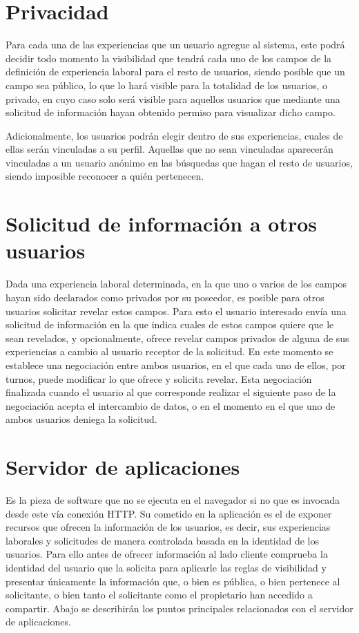 \documentclass[a4paper, 12pt]{book}
\begin{document}
\section{Privacidad}
\label{sec:intro_privacity}
Para cada una de las experiencias que un usuario agregue al sistema, este podrá decidir todo momento la visibilidad que tendrá cada uno de los campos de la definición de experiencia laboral para el resto de usuarios, siendo posible que un campo sea público, lo que lo hará visible para la totalidad de los usuarios, o privado, en cuyo caso solo será visible para aquellos usuarios que mediante  una solicitud de información hayan obtenido permiso para visualizar dicho campo.

Adicionalmente, los usuarios podrán elegir dentro de sus experiencias, cuales de ellas serán vinculadas a su perfil. Aquellas que no sean vinculadas aparecerán vinculadas a un usuario anónimo en las búsquedas que hagan el resto de usuarios, siendo imposible reconocer a quién pertenecen.

\section{Solicitud de información a otros usuarios}
\label{sec:intro_inforequest}
Dada una experiencia laboral determinada, en la que uno o varios de los campos hayan sido declarados como privados por su poseedor, es posible para otros usuarios solicitar revelar estos campos.
Para esto el usuario interesado envía una solicitud de información en la que indica cuales de estos campos quiere que le sean revelados, y opcionalmente, ofrece revelar campos privados de alguna de sus experiencias a cambio al usuario receptor de la solicitud.
En este momento se establece una negociación entre ambos usuarios, en el que cada uno de ellos, por turnos, puede modificar lo que ofrece y solicita revelar. Esta negociación finalizada cuando el usuario al que corresponde realizar el siguiente paso de la negociación acepta el intercambio de datos, o en el momento en el que uno de ambos usuarios deniega la solicitud.


\section{Servidor de aplicaciones}
\label{sec:intro_applicationserver}

Es la pieza de software que no se ejecuta en el navegador si no que es invocada desde este vía conexión HTTP.
Su cometido en la aplicación es el de exponer recursos que ofrecen la información de los usuarios, es decir, sus experiencias laborales y solicitudes de manera controlada basada en la identidad de los usuarios.
Para ello antes de ofrecer información al lado cliente comprueba la identidad del usuario que la solicita para aplicarle las reglas de visibilidad y presentar únicamente la información que,
o bien es pública, o bien pertenece al solicitante, o bien tanto el solicitante como el propietario han accedido a compartir. Abajo se describirán los puntos principales relacionados con el servidor de aplicaciones.
\end{document}
